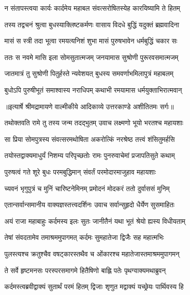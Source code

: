 \twolineshloka
{न संतापस्त्वया कार्यः कार्दमेय महाबल}
{संवत्सरोषितस्येह कारयिष्यामि ते हितम्} %

\twolineshloka
{तस्य तद्वचनं श्रुत्वा बुधस्याक्लिष्टकर्मणः}
{वासाय विदधे बुद्धिं यदुक्तं ब्रह्मवादिना} %

\twolineshloka
{मासं स स्त्री तदा भूत्वा रमयत्यनिशं शुभा}
{मासं पुरुषभावेन धर्मबुद्धिं चकार सः} %

\twolineshloka
{ततः स नवमे मासि इला सोमसुतात्मजम्}
{जनयामास सुश्रोणी पुरूरवसमात्मजम्} %

\twolineshloka
{जातमात्रं तु सुश्रोणी पितुर्हस्ते न्यवेशयत्}
{बुधस्य समवर्णाभमिलापुत्रं महाबलम्} %

\twolineshloka
{बुधोऽपि पुरुषीभूतं समाश्वास्य नराधिपम्}
{कथाभी रमयामास धर्मयुक्ताभिरात्मवान्} %


{॥इत्यार्षे श्रीमद्रामायणे वाल्मीकीये आदिकाव्ये उत्तरकाण्डे अशीतितमः सर्गः॥}


\twolineshloka
{तथोक्तवति रामे तु तस्य जन्म तदद्भुतम्}
{उवाच लक्ष्मणो भूयो भरतश्च महायशाः} %

\twolineshloka
{सा प्रिया सोमपुत्रस्य संवत्सरमथोषिता}
{अकरोत्किं नरश्रेष्ठ तत्त्वं शंसितुमर्हसि} %

\twolineshloka
{तयोस्तद्वाक्यमाधुर्यं निशम्य परिपृच्छतोः}
{रामः पुनरुवाचेमां प्रजापतिसुते कथाम्} %

\twolineshloka
{पुरुषत्वं गते शूरे बुधः परमबुद्धिमान्}
{संवर्तं परमोदारमाजुहाव महायशाः} %

\twolineshloka
{च्यवनं भृगुपुत्रं च मुनिं चारिष्टनेमिनम्}
{प्रमोदनं मोदकरं ततो दुर्वाससं मुनिम्} %

\twolineshloka
{एतान्सर्वान्समानीय वाक्यज्ञस्तत्त्वदर्शिनः}
{उवाच सर्वान्सुहृदो धैर्येण सुसमाहितः} %

\twolineshloka
{अयं राजा महाबाहुः कर्दमस्य इलः सुतः}
{जानीतैनं यथा भूतं श्रेयो ह्यस्य विधीयताम्} %

\twolineshloka
{तेषां संवदतामेव तमाश्रममुपागमत्}
{कर्दमः सुमहातेजा द्विजैः सह महात्मभिः} %

\twolineshloka
{पुलस्त्यश्च क्रतुश्चैव वषट्कारस्तथैव च}
{ओंकारश्च महातेजास्तमाश्रममुपागमन्} %

\twolineshloka
{ते सर्वे हृष्टमनसः परस्परसमागमे}
{हितैषिणो बाह्लि पतेः पृथग्वाक्यमथाब्रुवन्} %

\twolineshloka
{कर्दमस्त्वब्रवीद्वाक्यं सुतार्थं परमं हितम्}
{द्विजाः शृणुत मद्वाक्यं यच्छ्रेयः पार्थिवस्य हि} %

